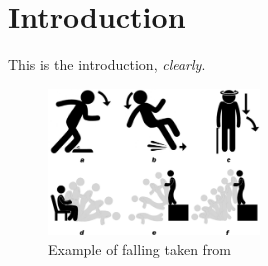\documentclass[../thesis.tex]{subfiles}
\begin{document}
\chapter{Introduction}

This is the introduction, \emph{clearly}.

\begin{figure}
    \centering
    \includegraphics[width=0.5\textwidth]{diagrams/falling_1.png}
    \caption[Example of Falling]{Example of falling taken from~\cite{ShuS2021}}
    \label{ch1:fig:falling1}
\end{figure}

\ifSubfilesClassLoaded{%
    \printbibliography[heading=chapterbibliography,segment=\therefsegment]
}{}
\end{document}
